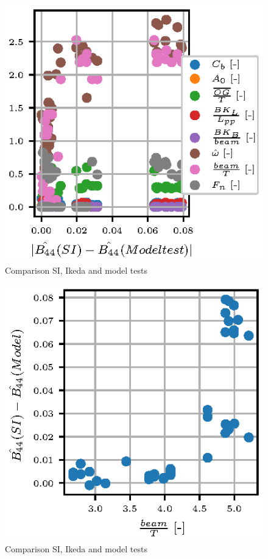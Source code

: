 \begin{figure}[H]
    \centering
    \includegraphics[]{figures/parameter_residual.eps}
        \vspace{-0.5cm}
    \caption{Comparison SI, Ikeda and model tests}
    \label{fig:si_ikeda_model}
\end{figure}

\begin{figure}[H]
    \centering
    \includegraphics[]{figures/beam_T_residual.eps}
        \vspace{-0.5cm}
    \caption{Comparison SI, Ikeda and model tests}
    \label{fig:si_ikeda_model}
\end{figure}

